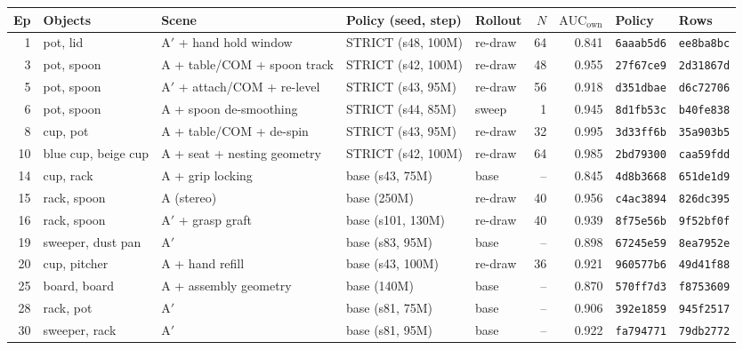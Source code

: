 \documentclass[10pt]{nvidiaextabstract}
\newcommand{\ownauc}{\ensuremath{\mathrm{AUC}_{\text{own}}}\xspace}
\begin{document}
\begin{table}[h]
  \centering\footnotesize
  \setlength{\tabcolsep}{3pt}
  \begin{tabular}{@{}rllllrrll@{}}
    \toprule
    \textbf{Ep} & \textbf{Objects} & \textbf{Scene} & \textbf{Policy (seed, step)} & \textbf{Rollout} & \textbf{$N$} & \textbf{\ownauc} & \textbf{Policy} & \textbf{Rows} \\
    \midrule
    1  & pot, lid & A$'$ + hand hold window & STRICT (s48, 100M) & re-draw & 64 & 0.841 & \texttt{6aaab5d6} & \texttt{ee8ba8bc} \\
    3  & pot, spoon & A + table/COM + spoon track & STRICT (s42, 100M) & re-draw & 48 & 0.955 & \texttt{27f67ce9} & \texttt{2d31867d} \\
    5  & pot, spoon & A$'$ + attach/COM + re-level & STRICT (s43, 95M) & re-draw & 56 & 0.918 & \texttt{d351dbae} & \texttt{d6c72706} \\
    6  & pot, spoon & A + spoon de-smoothing & STRICT (s44, 85M) & sweep & 1 & 0.945 & \texttt{8d1fb53c} & \texttt{b40fe838} \\
    8  & cup, pot & A + table/COM + de-spin & STRICT (s43, 95M) & re-draw & 32 & 0.995 & \texttt{3d33ff6b} & \texttt{35a903b5} \\
    10 & blue cup, beige cup & A + seat + nesting geometry & STRICT (s42, 100M) & re-draw & 64 & 0.985 & \texttt{2bd79300} & \texttt{caa59fdd} \\
    14 & cup, rack & A + grip locking & base (s43, 75M) & base & -- & 0.845 & \texttt{4d8b3668} & \texttt{651de1d9} \\
    15 & rack, spoon & A (stereo) & base (250M) & re-draw & 40 & 0.956 & \texttt{c4ac3894} & \texttt{826dc395} \\
    16 & rack, spoon & A$'$ + grasp graft & base (s101, 130M) & re-draw & 40 & 0.939 & \texttt{8f75e56b} & \texttt{9f52bf0f} \\
    19 & sweeper, dust pan & A$'$ & base (s83, 95M) & base & -- & 0.898 & \texttt{67245e59} & \texttt{8ea7952e} \\
    20 & cup, pitcher & A + hand refill & base (s43, 100M) & re-draw & 36 & 0.921 & \texttt{960577b6} & \texttt{49d41f88} \\
    25 & board, board & A + assembly geometry & base (140M) & base & -- & 0.870 & \texttt{570ff7d3} & \texttt{f8753609} \\
    28 & rack, pot & A$'$ & base (s81, 75M) & base & -- & 0.906 & \texttt{392e1859} & \texttt{945f2517} \\
    30 & sweeper, rack & A$'$ & base (s81, 95M) & base & -- & 0.922 & \texttt{fa794771} & \texttt{79db2772} \\

\end{tabular}
\end{table}
\end{document}
